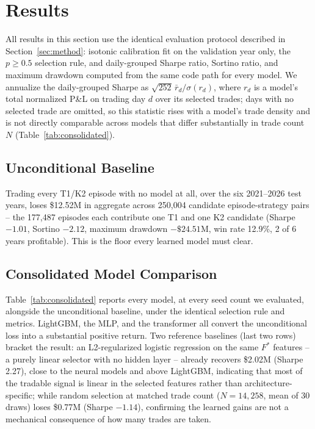 \documentclass[sigconf,review]{acmart}
\begin{document}
\section{Results}
\label{sec:results}

All results in this section use the identical evaluation protocol described in Section~\ref{sec:method}: isotonic calibration fit on the validation year only, the $p \ge 0.5$ selection rule, and daily-grouped Sharpe ratio, Sortino ratio, and maximum drawdown computed from the same code path for every model. We annualize the daily-grouped Sharpe as $\sqrt{252}\,\bar{r}_d/\sigma(r_d)$, where $r_d$ is a model's total normalized P\&L on trading day $d$ over its selected trades; days with no selected trade are omitted, so this statistic rises with a model's trade density and is not directly comparable across models that differ substantially in trade count $N$ (Table~\ref{tab:consolidated}).

\subsection{Unconditional Baseline}
Trading every T1/K2 episode with no model at all, over the six 2021--2026 test years, loses \$12.52M in aggregate across 250{,}004 candidate episode-strategy pairs -- the 177{,}487 episodes each contribute one T1 and one K2 candidate (Sharpe $-1.01$, Sortino $-2.12$, maximum drawdown $-\$24.51$M, win rate 12.9\%, 2 of 6 years profitable). This is the floor every learned model must clear.

\subsection{Consolidated Model Comparison}
\label{sec:seedcount}
Table~\ref{tab:consolidated} reports every model, at every seed count we evaluated, alongside the unconditional baseline, under the identical selection rule and metrics. LightGBM, the MLP, and the transformer all convert the unconditional loss into a substantial positive return. Two reference baselines (last two rows) bracket the result: an L2-regularized logistic regression on the same $F^{\ast}$ features -- a purely linear selector with no hidden layer -- already recovers \$2.02M (Sharpe 2.27), close to the neural models and above LightGBM, indicating that most of the tradable signal is linear in the selected features rather than architecture-specific; while random selection at matched trade count ($N{=}14{,}258$, mean of 30 draws) loses \$0.77M (Sharpe $-1.14$), confirming the learned gains are not a mechanical consequence of how many trades are taken.
\end{document}
